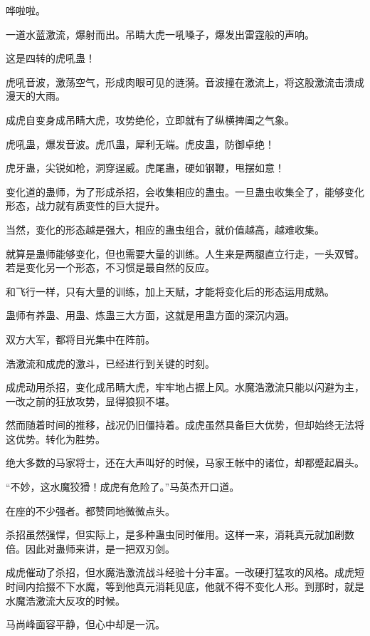 
\begin{this_body}

哗啦啦。

一道水蓝激流，爆射而出。吊睛大虎一吼嗓子，爆发出雷霆般的声响。

这是四转的虎吼蛊！

虎吼音波，激荡空气，形成肉眼可见的涟漪。音波撞在激流上，将这股激流击溃成漫天的大雨。

成虎自变身成吊睛大虎，攻势绝伦，立即就有了纵横捭阖之气象。

虎吼蛊，爆发音波。虎爪蛊，犀利无端。虎皮蛊，防御卓绝！

虎牙蛊，尖锐如枪，洞穿逞威。虎尾蛊，硬如钢鞭，甩摆如意！

变化道的蛊师，为了形成杀招，会收集相应的蛊虫。一旦蛊虫收集全了，能够变化形态，战力就有质变性的巨大提升。

当然，变化的形态越是强大，相应的蛊虫组合，就价值越高，越难收集。

就算是蛊师能够变化，但也需要大量的训练。人生来是两腿直立行走，一头双臂。若是变化另一个形态，不习惯是最自然的反应。

和飞行一样，只有大量的训练，加上天赋，才能将变化后的形态运用成熟。

蛊师有养蛊、用蛊、炼蛊三大方面，这就是用蛊方面的深沉内涵。

双方大军，都将目光集中在阵前。

浩激流和成虎的激斗，已经进行到关键的时刻。

成虎动用杀招，变化成吊睛大虎，牢牢地占据上风。水魔浩激流只能以闪避为主，一改之前的狂放攻势，显得狼狈不堪。

然而随着时间的推移，战况仍旧僵持着。成虎虽然具备巨大优势，但却始终无法将这优势。转化为胜势。

绝大多数的马家将士，还在大声叫好的时候，马家王帐中的诸位，却都蹙起眉头。

“不妙，这水魔狡猾！成虎有危险了。”马英杰开口道。

在座的不少强者。都赞同地微微点头。

杀招虽然强悍，但实际上，是多种蛊虫同时催用。这样一来，消耗真元就加剧数倍。因此对蛊师来讲，是一把双刃剑。

成虎催动了杀招，但水魔浩激流战斗经验十分丰富。一改硬打猛攻的风格。成虎短时间内拾掇不下水魔，等到他真元消耗见底，他就不得不变化人形。到那时，就是水魔浩激流大反攻的时候。

马尚峰面容平静，但心中却是一沉。


\end{this_body}

